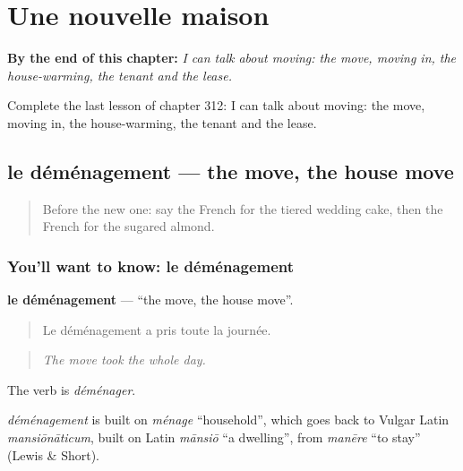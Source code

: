
\chapter{Une nouvelle maison}
\label{ch:fr-une-nouvelle-maison}

\begin{chapteropening}
\textbf{By the end of this chapter:} \emph{I can talk about moving: the move, moving in, the house-warming, the tenant and the lease.}

Complete the last lesson of chapter 312: I can talk about moving: the move, moving in, the house-warming, the tenant and the lease.
\end{chapteropening}

\section[le déménagement]{le déménagement — the move, the house move}

\label{lesson:FR-C312-demenagement}



\begin{quote}
Before the new one: say the French for the tiered wedding cake, then the French for the sugared almond.
\end{quote}

\subsection*{You'll want to know: le déménagement}
\textbf{le déménagement} — \textquotedblleft{}the move, the house move\textquotedblright{}.

\begin{quote}
Le déménagement a pris toute la journée.
\end{quote}

\begin{quote}
\emph{The move took the whole day.}
\end{quote}

The verb is \emph{déménager}.

\begin{cousinweb}
\emph{déménagement} is built on \emph{ménage} \textquotedblleft{}household\textquotedblright{}, which goes back to Vulgar Latin \emph{mansiōnāticum}, built on Latin \emph{mānsiō} \textquotedblleft{}a dwelling\textquotedblright{}, from \emph{manēre} \textquotedblleft{}to stay\textquotedblright{} (Lewis \& Short).
\end{cousinweb}

